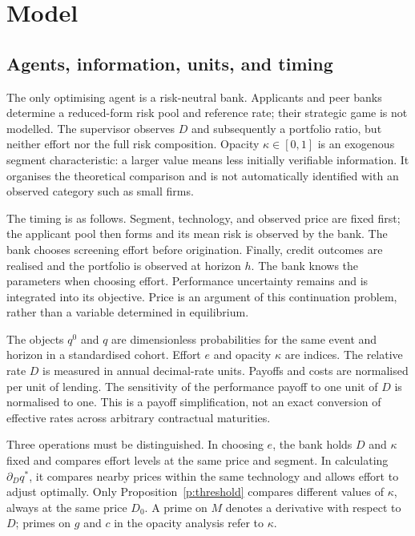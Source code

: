\documentclass[11pt]{article}
\theoremstyle{definition}\newtheorem{assumption}{Assumption}
\begin{document}
\section{Model}\label{sec:model}
\subsection{Agents, information, units, and timing}
The only optimising agent is a risk-neutral bank. Applicants and peer banks
determine a reduced-form risk pool and reference rate; their strategic game
is not modelled. The supervisor observes $D$ and subsequently a portfolio
ratio, but neither effort nor the full risk composition. Opacity
$\kappa\in[0,1]$ is an exogenous segment characteristic: a larger value means
less initially verifiable information. It organises the theoretical comparison
and is not automatically identified with an observed category such as small firms.

The timing is as follows. Segment, technology, and observed price are fixed
first; the applicant pool then forms and its mean risk is observed by the bank.
The bank chooses screening effort before origination. Finally, credit outcomes
are realised and the portfolio is observed at horizon $h$. The bank knows the
parameters when choosing effort. Performance uncertainty remains and is
integrated into its objective. Price is an argument of this continuation
problem, rather than a variable determined in equilibrium.

The objects $q^0$ and $q$ are dimensionless probabilities for the same event
and horizon in a standardised cohort. Effort $e$ and opacity $\kappa$ are
indices. The relative rate $D$ is measured in annual decimal-rate units.
Payoffs and costs are normalised per unit of lending. The sensitivity of the
performance payoff to one unit of $D$ is normalised to one. This is a payoff
simplification, not an exact conversion of effective rates across arbitrary
contractual maturities.

Three operations must be distinguished. In choosing $e$, the bank holds
$D$ and $\kappa$ fixed and compares effort levels at the same price and
segment. In calculating $\partial_Dq^*$, it compares nearby prices within
the same technology and allows effort to adjust optimally. Only
Proposition~\ref{p:threshold} compares different values of $\kappa$, always
at the same price $D_0$. A prime on $M$ denotes a derivative with respect
to $D$; primes on $g$ and $c$ in the opacity analysis refer to $\kappa$.
\end{document}
